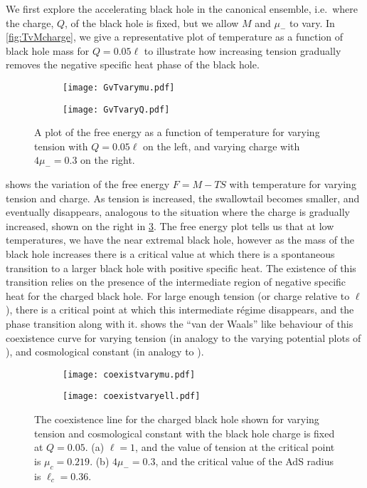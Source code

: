 \documentclass[
twoside,
openright,
frontopenright
]{dmathesis}
\begin{document}
We first explore the accelerating black hole in the canonical ensemble, i.e.\
where the charge, $Q$, of the black hole is fixed, but we allow $M$ and $\mu_-$
to vary.  In \cref{fig:TvMcharge}, we give a representative plot of
temperature as a function of black hole mass for $Q=0.05\ell$ to illustrate how
increasing tension gradually removes the negative specific heat phase of the
black hole.
\begin{figure}
    \centering
  \begin{subfigure}[b]{0.45\textwidth}
    \texttt{[image: GvTvarymu.pdf]}
    \caption{\label{fig:GvTchargea}}
  \end{subfigure}\quad
  \begin{subfigure}[b]{0.45\textwidth}
    \texttt{[image: GvTvaryQ.pdf]}
    \caption{\label{fig:GvTchargeb}}
  \end{subfigure}
  \caption{\label{fig:GvTcharge}A plot of the free energy as a function of
    temperature for varying tension with $Q=0.05\ell$ on the left, and varying
    charge with $4\mu_-=0.3$ on the right.}
\end{figure}
 shows the variation of the free energy $F=M-TS$ with
temperature for varying tension and charge. As tension is increased, the
swallowtail becomes smaller, and eventually disappears, analogous to the
situation where the charge is gradually increased, shown on the right in
\cref{fig:GvTcharge}. The free energy plot tells us that at low temperatures, we
have the near extremal black hole, however as the mass of the black hole
increases there is a critical value at which there is a spontaneous transition
to a larger black hole with positive specific heat. The existence of this
transition relies on the presence of the intermediate region of negative
specific heat for the charged black hole.  For large enough tension (or charge
relative to $\ell$), there is a critical point at which this intermediate
r\'egime disappears, and the phase transition along with it. 
shows the ``van der Waals'' like behaviour of this coexistence curve for varying
tension (in analogy to the varying potential plots of \cite{Chamblin:1999tk}),
and cosmological constant (in analogy to \cite{Kubiznak:2012wp}).
\begin{figure}
  \centering
  \begin{subfigure}[b]{0.45\textwidth}
    \texttt{[image: coexistvarymu.pdf]}
    \caption{\label{fig:coexista}}
  \end{subfigure}\quad
  \begin{subfigure}[b]{0.45\textwidth}
    \texttt{[image: coexistvaryell.pdf]}
    \caption{\label{fig:coexistb}}
  \end{subfigure}
  \caption{\label{fig:coexist}The coexistence line for the charged black hole
    shown for varying tension and cosmological constant with the black hole
    charge is fixed at $Q=0.05$. (a) $\ell=1$, and the value of tension
    at the critical point is $\mu_c = 0.219$. (b) $4\mu_- = 0.3$, and
    the critical value of the AdS radius is $\ell_c = 0.36$.}
\end{figure}
\end{document}
